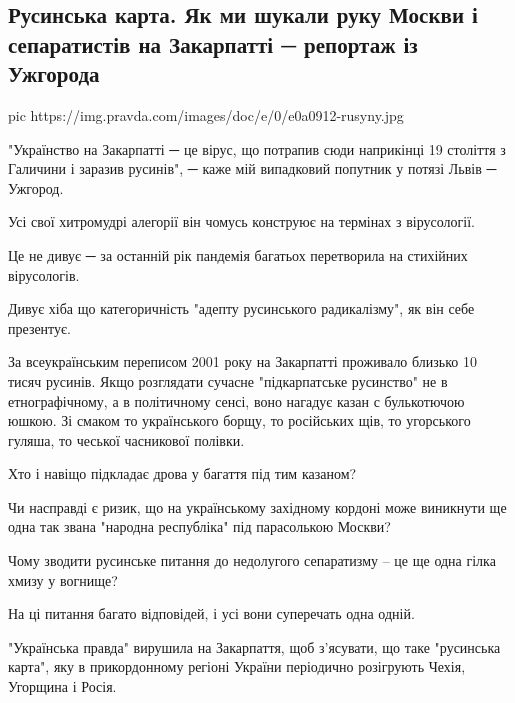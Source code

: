  
 
 

\subsection{Русинська карта. Як ми шукали руку Москви і сепаратистів на Закарпатті ─ репортаж із Ужгорода}


\ifcmt
pic https://img.pravda.com/images/doc/e/0/e0a0912-rusyny.jpg
\fi

"Українство на Закарпатті ─ це вірус, що потрапив сюди наприкінці 19 століття з
Галичини і заразив русинів", ─ каже мій випадковий попутник у потязі Львів ─
Ужгород.

Усі свої хитромудрі алегорії він чомусь конструює на термінах з вірусології.

Це не дивує ─ за останній рік пандемія багатьох перетворила на стихійних
вірусологів.

Дивує хіба що категоричність "адепту русинського радикалізму", як він себе
презентує.

За всеукраїнським переписом 2001 року на Закарпатті проживало близько 10 тисяч
русинів. Якщо розглядати сучасне "підкарпатське русинство" не в етнографічному,
а в політичному сенсі, воно нагадує казан с булькотючою юшкою. Зі смаком то
українського борщу, то російських щів, то угорського гуляша, то чеської
часникової полівки.

Хто і навіщо підкладає дрова у багаття під тим казаном?

Чи насправді є ризик, що на українському західному кордоні може виникнути ще
одна так звана "народна республіка" під парасолькою Москви?

Чому зводити русинське питання до недолугого сепаратизму – це ще одна гілка
хмизу у вогнище?

На ці питання багато відповідей, і усі вони суперечать одна одній.

"Українська правда" вирушила на Закарпаття, щоб з’ясувати, що таке "русинська
карта", яку в прикордонному регіоні України періодично розігрують Чехія,
Угорщина і Росія.

